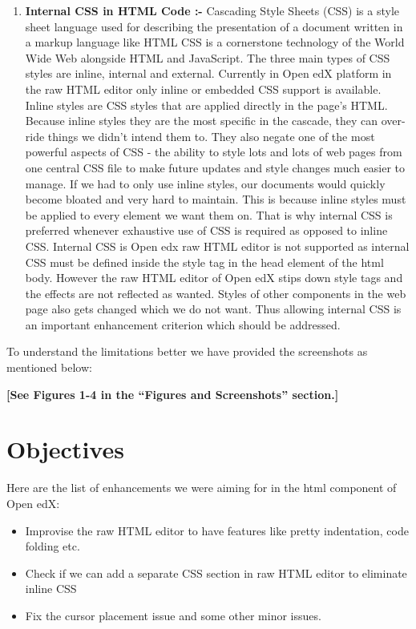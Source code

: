 \begin{enumerate}
  \item \textbf{Internal CSS in HTML Code :-}\newline\newline
Cascading Style Sheets (CSS) is a style sheet language used for describing the
presentation of a document written in a markup language like HTML CSS is a
cornerstone technology of the World Wide Web alongside HTML and JavaScript.\newline\newline
The three main types of CSS styles are inline, internal and external. Currently in
Open edX platform in the raw HTML editor only inline or embedded CSS support is
available. Inline styles are CSS styles that are applied directly in the page's HTML.
Because inline styles they are the most specific in the cascade, they can over-ride
things we didn't intend them to. They also negate one of the most powerful aspects
of CSS - the ability to style lots and lots of web pages from one central CSS file to
make future updates and style changes much easier to manage.\newline\newline
If we had to only use inline styles, our documents would quickly become bloated and
very hard to maintain. This is because inline styles must be applied to every element
we want them on. That is why internal CSS is preferred whenever exhaustive use of
CSS is required as opposed to inline CSS. Internal CSS is Open edx raw HTML
editor is not supported as internal CSS must be defined inside the style tag in the
head element of the html body. However the raw HTML editor of Open edX stips
down style tags and the effects are not reflected as wanted. Styles of other
components in the web page also gets changed which we do not want. Thus allowing
internal CSS is an important enhancement criterion which should be addressed.
\end{enumerate}

To understand the limitations better we have provided the screenshots as mentioned
below:
\begin{center}\textbf{[See Figures 1-4 in the “Figures and Screenshots” section.]}\end{center}


\section{Objectives}
Here are the list of enhancements we were aiming for in the html component of Open edX:
\begin{itemize}
  \item Improvise the raw HTML editor to have features like pretty indentation, code folding
etc.
  \item Check if we can add a separate CSS section in raw HTML editor to eliminate inline
CSS
\item Fix the cursor placement issue and some other minor issues.
\end{itemize}

